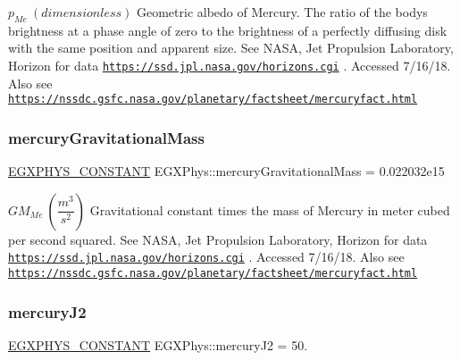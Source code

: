 $ p_{Me} \ (dimensionless)$ Geometric albedo of Mercury. The ratio of the body\textquotesingle{}s brightness at a phase angle of zero to the brightness of a perfectly diffusing disk with the same position and apparent size. See N\+A\+SA, Jet Propulsion Laboratory, Horizon for data \href{https://ssd.jpl.nasa.gov/horizons.cgi}{\tt https\+://ssd.\+jpl.\+nasa.\+gov/horizons.\+cgi} . Accessed 7/16/18. Also see \href{https://nssdc.gsfc.nasa.gov/planetary/factsheet/mercuryfact.html}{\tt https\+://nssdc.\+gsfc.\+nasa.\+gov/planetary/factsheet/mercuryfact.\+html} \mbox{\label{group___e_g_x_phys-_constants-_astrophysics-_solar_system-_mercury-_bulk_ga2f4f05dcf67675d3d11731cbd7f0eaba}} 
\subsubsection{\texorpdfstring{mercury\+Gravitational\+Mass}{mercuryGravitationalMass}}
{\footnotesize\ttfamily \mbox{\hyperlink{group___e_g_x_phys-_constants-_macros_ga76980d288494ce1714c9ac68a95ba702}{E\+G\+X\+P\+H\+Y\+S\+\_\+\+C\+O\+N\+S\+T\+A\+NT}} E\+G\+X\+Phys\+::mercury\+Gravitational\+Mass = 0.\+022032e15}

$ GM_{Me} \ (\dfrac{m^3}{s^2})$ Gravitational constant times the mass of Mercury in meter cubed per second squared. See N\+A\+SA, Jet Propulsion Laboratory, Horizon for data \href{https://ssd.jpl.nasa.gov/horizons.cgi}{\tt https\+://ssd.\+jpl.\+nasa.\+gov/horizons.\+cgi} . Accessed 7/16/18. Also see \href{https://nssdc.gsfc.nasa.gov/planetary/factsheet/mercuryfact.html}{\tt https\+://nssdc.\+gsfc.\+nasa.\+gov/planetary/factsheet/mercuryfact.\+html} \mbox{\label{group___e_g_x_phys-_constants-_astrophysics-_solar_system-_mercury-_bulk_ga0515d737bc0fda48122b7c195347e0bb}} 
\subsubsection{\texorpdfstring{mercury\+J2}{mercuryJ2}}
{\footnotesize\ttfamily \mbox{\hyperlink{group___e_g_x_phys-_constants-_macros_ga76980d288494ce1714c9ac68a95ba702}{E\+G\+X\+P\+H\+Y\+S\+\_\+\+C\+O\+N\+S\+T\+A\+NT}} E\+G\+X\+Phys\+::mercury\+J2 = 50.}

